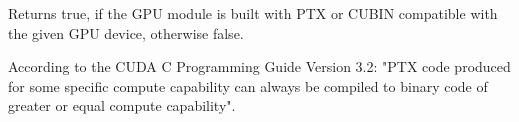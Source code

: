 Returns true, if the GPU module is built with PTX or CUBIN compatible with the given GPU device, otherwise false.

\begin{description}
\end{description}


According to the CUDA C Programming Guide Version 3.2: "PTX code produced for some specific compute capability can always be compiled to binary code of greater or equal compute capability". 

